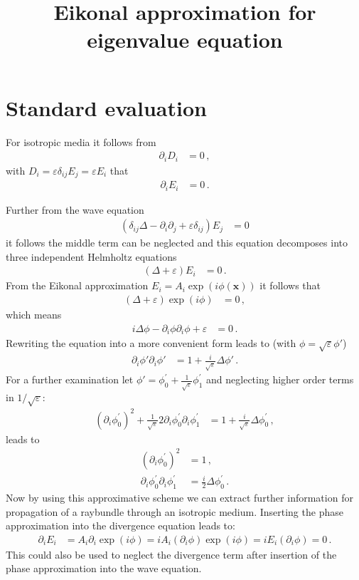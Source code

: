 \documentclass[a4paper,10pt]{revtex4-1}
\title{Eikonal approximation for eigenvalue equation}
\begin{document}
\section{Standard evaluation}

For isotropic media it follows from
\begin{align}
 \partial_i D_i &= 0\,,
\end{align}
with $D_i = \varepsilon \delta_{ij} E_j = \varepsilon E_i$ that
\begin{align}
 \partial_i E_i &= 0\,.
\end{align}

Further from the wave equation
\begin{align}
 (\delta_{ij} \Delta - \partial_i \partial_j + \varepsilon \delta_{ij}) E_j &= 0
\end{align}
it follows the middle term can be neglected and this equation decomposes into three independent Helmholtz equations
\begin{align}
  (\Delta + \varepsilon) E_i &= 0\,. 
\end{align}
From the Eikonal approximation $E_i = A_i \exp(i \phi(\mathbf{x}))$ it follows that
\begin{align}
  (\Delta + \varepsilon) \exp(i \phi) &= 0\,,
\end{align}
which means
\begin{align}
 i \Delta \phi - \partial_i \phi \partial_i \phi + \varepsilon &= 0\,.
\end{align}
Rewriting the equation into a more convenient form leads to (with $\phi = \sqrt{\varepsilon} \phi'$)
\begin{align}
 \partial_i \phi' \partial_i \phi' &= 1 + \frac{i}{\sqrt{\varepsilon}} \Delta \phi'\,.
\end{align}
For a further examination let $\phi' = \phi^\prime_0 + \frac{1}{\sqrt{\varepsilon}} \phi^\prime_1$ and neglecting higher order terms in $1/\sqrt{\varepsilon}$:
\begin{align}
 (\partial_i \phi^\prime_0)^2 + \frac{1}{\sqrt{\varepsilon}} 2 \partial_i \phi^\prime_0 \partial_i \phi^\prime_1 &= 1 + \frac{i}{\sqrt{\varepsilon}} \Delta \phi^\prime_0\,,
\end{align}
leads to
\begin{align}
 (\partial_i \phi^\prime_0)^2 &= 1\,,\\
 \partial_i \phi^\prime_0 \partial_i \phi^\prime_1 &= \frac{i}{2} \Delta \phi^\prime_0\,.
\end{align}
Now by using this approximative scheme we can extract further information for propagation of a raybundle through an isotropic medium.
Inserting the phase approximation into the divergence equation leads to:
\begin{align}
 \partial_i E_i &= A_i \partial_i \exp(i \phi) = i A_i (\partial_i \phi) \exp(i \phi) = i E_i (\partial_i \phi) = 0\,. 
\end{align}
This could also be used to neglect the divergence term after insertion of the phase approximation into the wave equation.
\end{document}
